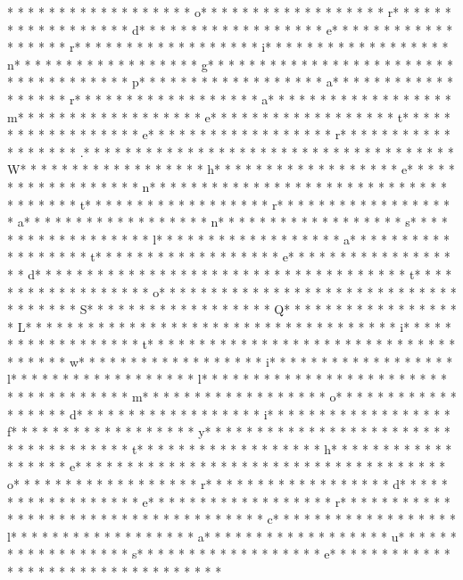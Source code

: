 * * *  * * *  * * *  *  * * *  *  * * *  * o* * *  * * *  * * *  *  * * *  *  * * *  * r* * *  * * *  * * *  *  * * *  *  * * *  * d* * *  * * *  * * *  *  * * *  *  * * *  * e* * *  * * *  * * *  *  * * *  *  * * *  * r* * *  * * *  * * *  *  * * *  *  * * *  * i* * *  * * *  * * *  *  * * *  *  * * *  * n* * *  * * *  * * *  *  * * *  *  * * *  * g* * *  * * *  * * *  *  * * *  *  * * *  *  * * *  * * *  * * *  *  * * *  *  * * *  * p* * *  * * *  * * *  *  * * *  *  * * *  * a* * *  * * *  * * *  *  * * *  *  * * *  * r* * *  * * *  * * *  *  * * *  *  * * *  * a* * *  * * *  * * *  *  * * *  *  * * *  * m* * *  * * *  * * *  *  * * *  *  * * *  * e* * *  * * *  * * *  *  * * *  *  * * *  * t* * *  * * *  * * *  *  * * *  *  * * *  * e* * *  * * *  * * *  *  * * *  *  * * *  * r* * *  * * *  * * *  *  * * *  *  * * *  * .* * *  * * *  * * *  *  * * *  *  * * *  *  * * *  * * *  * * *  *  * * *  *  * * *  * W* * *  * * *  * * *  *  * * *  *  * * *  * h* * *  * * *  * * *  *  * * *  *  * * *  * e* * *  * * *  * * *  *  * * *  *  * * *  * n* * *  * * *  * * *  *  * * *  *  * * *  *  * * *  * * *  * * *  *  * * *  *  * * *  * t* * *  * * *  * * *  *  * * *  *  * * *  * r* * *  * * *  * * *  *  * * *  *  * * *  * a* * *  * * *  * * *  *  * * *  *  * * *  * n* * *  * * *  * * *  *  * * *  *  * * *  * s* * *  * * *  * * *  *  * * *  *  * * *  * l* * *  * * *  * * *  *  * * *  *  * * *  * a* * *  * * *  * * *  *  * * *  *  * * *  * t* * *  * * *  * * *  *  * * *  *  * * *  * e* * *  * * *  * * *  *  * * *  *  * * *  * d* * *  * * *  * * *  *  * * *  *  * * *  *  * * *  * * *  * * *  *  * * *  *  * * *  * t* * *  * * *  * * *  *  * * *  *  * * *  * o* * *  * * *  * * *  *  * * *  *  * * *  *  * * *  * * *  * * *  *  * * *  *  * * *  * S* * *  * * *  * * *  *  * * *  *  * * *  * Q* * *  * * *  * * *  *  * * *  *  * * *  * L* * *  * * *  * * *  *  * * *  *  * * *  *  * * *  * * *  * * *  *  * * *  *  * * *  * i* * *  * * *  * * *  *  * * *  *  * * *  * t* * *  * * *  * * *  *  * * *  *  * * *  *  * * *  * * *  * * *  *  * * *  *  * * *  * w* * *  * * *  * * *  *  * * *  *  * * *  * i* * *  * * *  * * *  *  * * *  *  * * *  * l* * *  * * *  * * *  *  * * *  *  * * *  * l* * *  * * *  * * *  *  * * *  *  * * *  *  * * *  * * *  * * *  *  * * *  *  * * *  * m* * *  * * *  * * *  *  * * *  *  * * *  * o* * *  * * *  * * *  *  * * *  *  * * *  * d* * *  * * *  * * *  *  * * *  *  * * *  * i* * *  * * *  * * *  *  * * *  *  * * *  * f* * *  * * *  * * *  *  * * *  *  * * *  * y* * *  * * *  * * *  *  * * *  *  * * *  *  * * *  * * *  * * *  *  * * *  *  * * *  * t* * *  * * *  * * *  *  * * *  *  * * *  * h* * *  * * *  * * *  *  * * *  *  * * *  * e* * *  * * *  * * *  *  * * *  *  * * *  *  * * *  * * *  * * *  *  * * *  *  * * *  * o* * *  * * *  * * *  *  * * *  *  * * *  * r* * *  * * *  * * *  *  * * *  *  * * *  * d* * *  * * *  * * *  *  * * *  *  * * *  * e* * *  * * *  * * *  *  * * *  *  * * *  * r* * *  * * *  * * *  *  * * *  *  * * *  *  * * *  * * *  * * *  *  * * *  *  * * *  * c* * *  * * *  * * *  *  * * *  *  * * *  * l* * *  * * *  * * *  *  * * *  *  * * *  * a* * *  * * *  * * *  *  * * *  *  * * *  * u* * *  * * *  * * *  *  * * *  *  * * *  * s* * *  * * *  * * *  *  * * *  *  * * *  * e* * *  * * *  * * *  *  * * *  *  * * *  *  * * *  * * *  * * *  *  * * *  *  * 